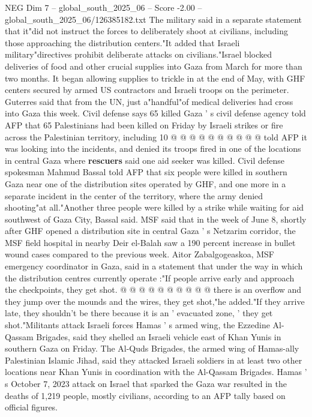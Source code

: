 \begin{textsample}{NEG Dim 7 – global\_south\_2025\_06 – Score -2.00 – global\_south\_2025\_06/126385182.txt}
The military said in a separate statement that it"did not instruct the forces to deliberately shoot at civilians, including those approaching the distribution centers."It added that Israeli military"directives prohibit deliberate attacks on civilians."Israel blocked deliveries of food and other crucial supplies into Gaza from March for more than two months.
It began allowing supplies to trickle in at the end of May, with GHF centers secured by armed US contractors and Israeli troops on the perimeter.
Guterres said that from the UN, just a"handful"of medical deliveries had cross into Gaza this week.
Civil defense says 65 killed Gaza ' s civil defense agency told AFP that 65 Palestinians had been killed on Friday by Israeli strikes or fire across the Palestinian territory, including 10 @ @ @ @ @ @ @ @ @ @ told AFP it was looking into the incidents, and denied its troops fired in one of the locations in central Gaza where \textbf{rescuers} said one aid seeker was killed.
Civil defense spokesman Mahmud Bassal told AFP that six people were killed in southern Gaza near one of the distribution sites operated by GHF, and one more in a separate incident in the center of the territory, where the army denied shooting"at all."Another three people were killed by a strike while waiting for aid southwest of Gaza City, Bassal said.
MSF said that in the week of June 8, shortly after GHF opened a distribution site in central Gaza ' s Netzarim corridor, the MSF field hospital in nearby Deir el-Balah saw a 190 percent increase in bullet wound cases compared to the previous week.
Aitor Zabalgogeaskoa, MSF emergency coordinator in Gaza, said in a statement that under the way in which the distribution centres currently operate :"If people arrive early and approach the checkpoints, they get shot. @ @ @ @ @ @ @ @ @ @ there is an overflow and they jump over the mounds and the wires, they get shot,"he added."If they arrive late, they shouldn't be there because it is an ' evacuated zone, ' they get shot."Militants attack Israeli forces Hamas ' s armed wing, the Ezzedine Al-Qassam Brigades, said they shelled an Israeli vehicle east of Khan Yunis in southern Gaza on Friday.
The Al-Quds Brigades, the armed wing of Hamas-ally Palestinian Islamic Jihad, said they attacked Israeli soldiers in at least two other locations near Khan Yunis in coordination with the Al-Qassam Brigades.
Hamas ' s October 7, 2023 attack on Israel that sparked the Gaza war resulted in the deaths of 1,219 people, mostly civilians, according to an AFP tally based on official figures.

\end{textsample}

